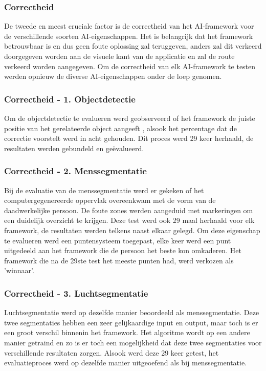 \subsubsection{Correctheid}
De tweede en meest cruciale factor is de correctheid van het AI-framework voor de verschillende soorten AI-eigenschappen. Het is belangrijk dat het framework betrouwbaar is en dus geen foute oplossing zal teruggeven, anders zal dit verkeerd doorgegeven worden aan de visuele kant van de applicatie en zal de route verkeerd worden aangegeven. Om de correctheid van elk AI-framework te testen werden opnieuw de diverse AI-eigenschappen onder de loep genomen.

\subsubsection{Correctheid - 1.  Objectdetectie}
Om de objectdetectie te evalueren werd geobserveerd of het framework de juiste positie van het gerelateerde object aangeeft , alsook het percentage dat de correctie voorstelt werd in acht gehouden. Dit proces werd 29 keer herhaald, de resultaten werden gebundeld en geëvalueerd. 

\subsubsection{Correctheid - 2. Menssegmentatie}
Bij de evaluatie van de menssegmentatie werd er gekeken of het computergegenereerde oppervlak overeenkwam met de vorm van de daadwerkelijke persoon. De foute zones werden aangeduid met markeringen om een duidelijk overzicht te krijgen. Deze test werd ook 29 maal herhaald voor elk framework, de resultaten werden telkens naast elkaar gelegd. Om deze eigenschap te evalueren werd een puntensysteem toegepast, elke keer werd een punt uitgedeeld aan het framework die de persoon het beste kon omkaderen. Het framework die na de 29ste test het meeste punten had, werd verkozen als 'winnaar'.

\subsubsection{Correctheid - 3. Luchtsegmentatie}
Luchtsegmentatie werd op dezelfde manier beoordeeld als menssegmentatie. Deze twee segmentaties hebben een zeer gelijkaardige input en output, maar toch is er een groot verschil binnenin het framework. Het algoritme wordt op een andere manier getraind en zo is er toch een mogelijkheid dat deze twee segmentaties voor verschillende resultaten zorgen. Alsook werd deze 29 keer getest, het evaluatieproces werd op dezelfde manier uitgeoefend als bij menssegmentatie.


